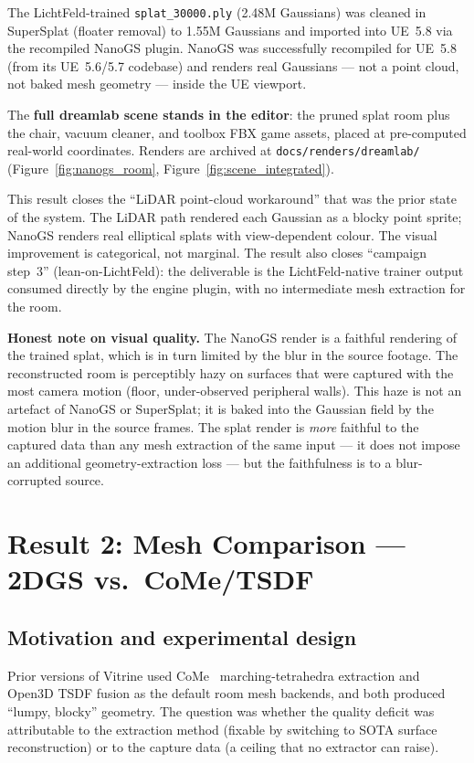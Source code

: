 The LichtFeld-trained \texttt{splat\_30000.ply} (2.48M Gaussians) was cleaned in
SuperSplat (floater removal) to 1.55M Gaussians and imported into UE~5.8 via the
recompiled NanoGS plugin.  NanoGS was successfully recompiled for UE~5.8 (from its
UE~5.6/5.7 codebase) and renders real Gaussians --- not a point cloud, not baked mesh
geometry --- inside the UE viewport.

The \textbf{full dreamlab scene stands in the editor}: the pruned splat room plus the
chair, vacuum cleaner, and toolbox FBX game assets, placed at pre-computed real-world
coordinates.  Renders are archived at \texttt{docs/renders/dreamlab/}
(Figure~\ref{fig:nanogs_room}, Figure~\ref{fig:scene_integrated}).

This result closes the ``LiDAR point-cloud workaround'' that was the prior state of the
system.  The LiDAR path rendered each Gaussian as a blocky point sprite; NanoGS renders
real elliptical splats with view-dependent colour.  The visual improvement is categorical,
not marginal.  The result also closes ``campaign step~3'' (lean-on-LichtFeld): the
deliverable is the LichtFeld-native trainer output consumed directly by the engine plugin,
with no intermediate mesh extraction for the room.

\textbf{Honest note on visual quality.} The NanoGS render is a faithful rendering of the
trained splat, which is in turn limited by the blur in the source footage.  The
reconstructed room is perceptibly hazy on surfaces that were captured with the most
camera motion (floor, under-observed peripheral walls).  This haze is not an artefact of
NanoGS or SuperSplat; it is baked into the Gaussian field by the motion blur in the
source frames.  The splat render is \emph{more} faithful to the captured data than any
mesh extraction of the same input --- it does not impose an additional geometry-extraction
loss --- but the faithfulness is to a blur-corrupted source.

\section{Result 2: Mesh Comparison --- 2DGS vs.\ CoMe/TSDF}
\label{sec:results:mesh}

\subsection{Motivation and experimental design}
Prior versions of Vitrine used CoMe~\cite{radl2026_come} marching-tetrahedra extraction
and Open3D TSDF fusion as the default room mesh backends, and both produced ``lumpy,
blocky'' geometry.  The question was whether the quality deficit was attributable to the
extraction method (fixable by switching to SOTA surface reconstruction) or to the capture
data (a ceiling that no extractor can raise).

